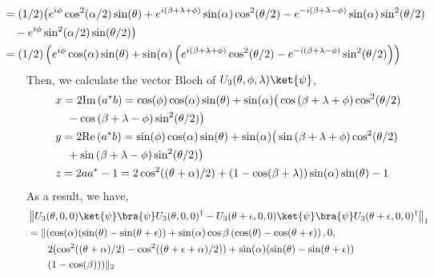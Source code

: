 \begin{example} 
\begin{align*}
  \hspace{-25pt} & = (1/2) \big( e^{i \phi} \cos^2(\alpha/2) \sin(\theta) + e^{i (\beta + \lambda + \phi)} \sin(\alpha) \cos^2(\theta/2) - e^{-i (\beta + \lambda -\phi)} \sin(\alpha) \sin^2(\theta/2) \\
  \hspace{-25pt} & \hspace{10pt}  - e^{i \phi} \sin^2(\alpha/2) \sin(\theta/2)  \big) \\
  \hspace{-25pt} & = (1/2) \left( e^{i \phi}\cos(\alpha) \sin(\theta) +  \sin(\alpha) \left(e^{i (\beta + \lambda + \phi)} \cos^2(\theta/2) - e^{-i (\beta + \lambda - \phi)} \sin^2(\theta/2)\right)  \right)
\end{align*}
Then, we calculate the vector Bloch of $U_3(\theta, \phi, \lambda) \ket{\psi}$,
\begin{align} \label{eq:coord_u3}
  &x = 2 \text{Im} \left( a^{*}b \right) =   \cos(\phi) \cos(\alpha) \sin(\theta) +  \sin(\alpha) \big(\cos{(\beta + \lambda + \phi)} \cos^2(\theta/2) \notag\\
  & \hspace{10pt} - \cos{(\beta + \lambda - \phi)} \sin^2(\theta/2)\big) \notag \\
  &y = 2 \text{Re} \left( a^{*}b \right) = \sin(\phi) \cos(\alpha) \sin(\theta) +  \sin(\alpha) \big(\sin{(\beta + \lambda + \phi)} \cos^2(\theta/2)  \\
  & \hspace{10pt} + \sin{(\beta + \lambda - \phi)} \sin^2(\theta/2)\big) \notag \\
  & z = 2 aa^* -1 = 2 \cos^2((\theta+\alpha)/2)+(1-\cos(\beta + \lambda))\sin(\alpha)\sin(\theta) -1 \notag
\end{align}
As a result, we have,
\begin{align*}
  & \tracenorm{U_3(\theta, 0, 0) \ket{\psi}\bra{\psi} U_3(\theta, 0, 0)^\dag - U_3(\theta + \epsilon, 0, 0) \ket{\psi}\bra{\psi}U_3(\theta+\epsilon, 0, 0)^\dag } \\
  & = \lVert ( \cos(\alpha) (\sin(\theta) - \sin(\theta + \epsilon)) +  \sin(\alpha) \cos{\beta} \left(\cos(\theta) - \cos(\theta + \epsilon) \right) , 0,\\
  & \hspace{20pt} 2 (\cos^2((\theta+\alpha)/2) - \cos^2((\theta+ \epsilon+\alpha)/2))+\sin(\alpha)(\sin(\theta) - \sin(\theta+\epsilon)) \\
  & \hspace{20pt} (1-\cos(\beta)))  \rVert_2 \\

\end{align*}
\end{example}
